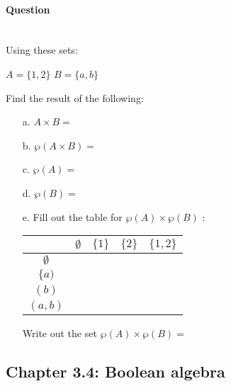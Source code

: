 \documentclass[a4paper,12pt]{book} \usepackage[utf8]{inputenc} \title{} \author{Rachel Morris} \date{\today}
\newcounter{question}
\begin{document}
    \paragraph{Question \thequestion} ~\\

Using these sets:

            \begin{center}
                $A = \{ 1, 2 \}$ \tab $B = \{ a, b \}$
            \end{center}

        Find the result of the following:

        \begin{enumerate}
            \item[a.]   $A \times B = $
            \item[b.]   $\wp( A \times B ) = $
            \item[c.]   $\wp(A) = $
            \item[d.]   $\wp(B) = $
            \item[e.]   Fill out the table for $\wp(A) \times \wp(B)$ :

                \begin{tabular}{ c | p{2.5cm} | p{2.5cm} | p{2.5cm} | p{2.5cm} }
                    & $\emptyset$ & $\{1\}$ & $\{2\}$ & $\{1, 2\}$
                    \\ \hline
                    $\emptyset$ & & & &
                    \\ \hline
                    $\{a)$ & & & &
                    \\ \hline
                    $(b)$ & & & &
                    \\ \hline
                    $(a, b)$ & & & &
                    \\
                \end{tabular}

                Write out the set $\wp(A) \times \wp(B) = $
        \end{enumerate}



    \subsection*{Chapter 3.4: Boolean algebra}

\end{document}
